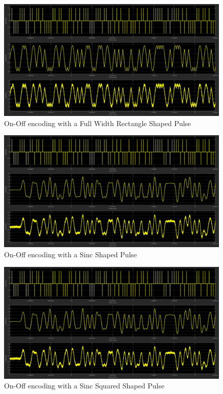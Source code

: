 \documentclass{article}
\begin{document}
\begin{figure}[H]
  \includegraphics[width = \linewidth]{Polar_Sin.jpg}
  \caption{On-Off encoding with a Full Width Rectangle Shaped Pulse}
  \label{fig:Polar-Sin}
\end{figure}
\begin{figure}[H]
  \includegraphics[width = \linewidth]{Polar_Sinc.jpg}
  \caption{On-Off encoding with a Sinc Shaped Pulse}
  \label{fig:Polar-Sinc}
\end{figure}
\begin{figure}[H]
  \includegraphics[width = \linewidth]{Polar_Squared.jpg}
  \caption{On-Off encoding with a Sinc Squared Shaped Pulse}
  \label{fig:Polar-Squared}
\end{figure}
\end{document}
